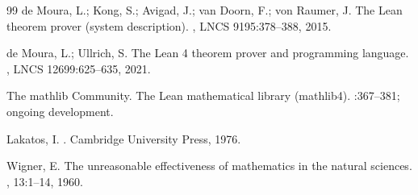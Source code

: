 \documentclass[11pt,a4paper]{article}
\theoremstyle{definition}
\begin{document}
\begin{thebibliography}{99}
de Moura, L.; Kong, S.; Avigad, J.; van Doorn, F.; von Raumer, J.
\newblock The Lean theorem prover (system description).
, LNCS 9195:378--388, 2015.

de Moura, L.; Ullrich, S.
\newblock The Lean 4 theorem prover and programming language.
, LNCS 12699:625--635, 2021.

The mathlib Community.
\newblock The Lean mathematical library (mathlib4).
:367--381; ongoing development.

Lakatos, I.
.
\newblock Cambridge University Press, 1976.

Wigner, E.
\newblock The unreasonable effectiveness of mathematics in the natural sciences.
, 13:1--14, 1960.

\end{thebibliography}
\end{document}
